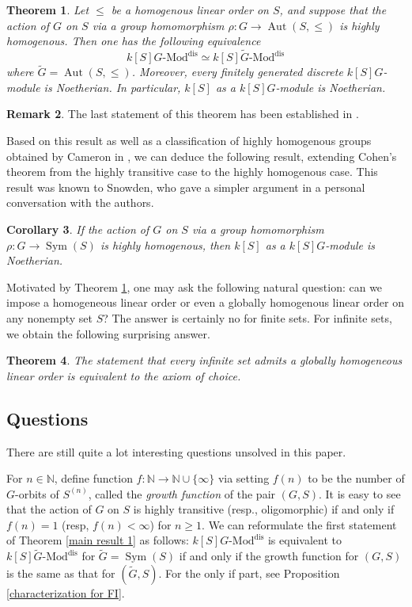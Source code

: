\documentclass[11pt, reqno]{amsart}
\theoremstyle{plain}
\newtheorem{theorem}{Theorem}[section]
\newtheorem{corollary}[theorem]{Corollary}
\numberwithin{equation}{section}
\theoremstyle{definition}
\newtheorem{remark}[theorem]{Remark}
\newcommand{\Mod}{{\textrm{-}\mathrm{Mod}}}
\DeclareMathOperator{\Aut}{Aut}
\DeclareMathOperator{\Sym}{Sym}
\newcommand{\dis}{{\mathrm{dis}}}
\begin{document}
\begin{theorem} \label{main result 2}
Let $\leqslant$ be a homogenous linear order on $S$, and suppose that the action of $G$ on $S$ via a group homomorphism $\rho: G \to \Aut(S, \leqslant)$ is highly homogenous. Then one has the following equivalence
\[
k[S]G \Mod^{\dis} \simeq k[S]\tilde{G} \Mod^{\dis}
\]
where $\tilde{G} = \Aut(S, \leqslant)$. Moreover, every finitely generated discrete $k[S]G$-module is Noetherian. In particular, $k[S]$ as a $k[S]G$-module is Noetherian.
\end{theorem}

\begin{remark}
The last statement of this theorem has been established in \cite[Example 3.2(c)]{LS}.
\end{remark}

Based on this result as well as a classification of highly homogenous groups obtained by Cameron in \cite{Ca76}, we can deduce the following result, extending Cohen's theorem from the highly transitive case to the highly homogenous case. This result was known to Snowden, who gave a simpler argument in a personal conversation with the authors.

\begin{corollary} \label{main corollary}
If the action of $G$ on $S$ via a group homomorphism $\rho: G \to \Sym(S)$ is highly homogenous, then $k[S]$ as a $k[S]G$-module is Noetherian.
\end{corollary}

Motivated by Theorem \ref{main result 2}, one may ask the following natural question: can we impose a homogeneous linear order or even a globally homogenous linear order on any nonempty set $S$? The answer is certainly no for finite sets. For infinite sets, we obtain the following surprising answer.

\begin{theorem} \label{main result 3}
The statement that every infinite set admits a globally homogeneous linear order is equivalent to the axiom of choice.
\end{theorem}


\subsection{Questions}

There are still quite a lot interesting questions unsolved in this paper.

For $n \in \mathbb{N}$, define function $f: \mathbb{N} \to \mathbb{N} \cup \{ \infty \}$ via setting $f(n)$ to be the number of $G$-orbits of $S^{(n)}$, called the \textit{growth function} of the pair $(G, S)$. It is easy to see that the action of $G$ on $S$ is highly transitive (resp., oligomorphic) if and only if $f(n) = 1$ (resp, $f(n) < \infty$) for $n \geqslant 1$. We can reformulate the first statement of Theorem \ref{main result 1} as follows: $k[S]G \Mod^{\dis}$ is equivalent to $k[S]\tilde{G} \Mod^{\dis}$ for $\tilde{G} = \Sym(S)$ if and only if the growth function for $(G, S)$ is the same as that for $(\tilde{G}, S)$. For the only if part, see Proposition \ref{characterization for FI}.
\end{document}
